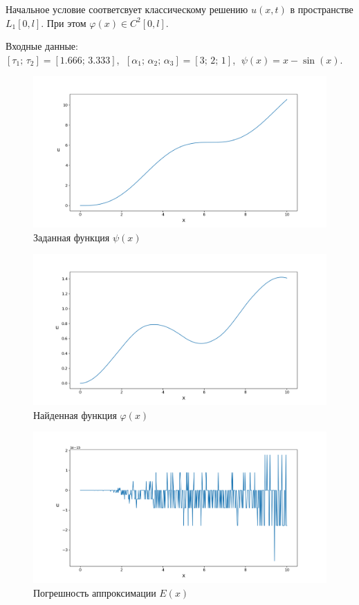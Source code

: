 \documentclass{article}
\theoremstyle{definition}
\begin{document}
Начальное условие соответсвует классическому решению $u(x,t)$ в пространстве $L_1[0,l]$. При этом
$\varphi(x) \in C^2[0,l]$.
\vspace{5mm}

Входные данные: \\
$[\tau_1;\, \tau_2] = [1.666;\, 3.333]$, $\;[\alpha_1;\, \alpha_2;\, \alpha_3] = [3;\, 2;\, 1]$, 
$\;\psi(x) = x - \sin(x)$.
\begin{figure}[H]
	\centering
	\includegraphics[trim={2.475cm, 0, 0, 1.5cm}, clip, scale=0.624]{410_psi.png}
	\caption{Заданная функция $\psi(x)$}
	\label{fig:image10}
\end{figure}

\begin{figure}[H]
	\centering
	\includegraphics[trim={2.3cm, 0, 0, 1.5cm}, clip, scale=0.62]{4_u0.png}
	\caption{Найденная функция $\varphi(x)$}
	\label{fig:image11}
\end{figure}

\begin{figure}[H]
	\centering
	\includegraphics[trim={2.475cm, 0, 0, 1.5cm}, clip, scale=0.624]{4_E.png}
	\caption{Погрешность аппроксимации $E(x)$}
	\label{fig:image12}
\end{figure}
\end{document}
